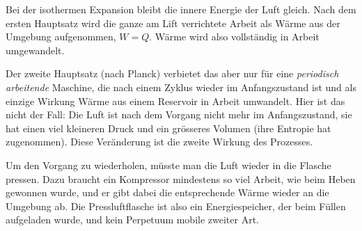 Bei der isothermen Expansion bleibt die innere Energie der Luft gleich. Nach dem ersten Hauptsatz wird die ganze am Lift verrichtete Arbeit als Wärme aus der Umgebung aufgenommen, $W = Q$. Wärme wird also vollständig in Arbeit umgewandelt.

Der zweite Hauptsatz (nach Planck) verbietet das aber nur für eine \emph{periodisch arbeitende} Maschine, die nach einem Zyklus wieder im Anfangszustand ist und als einzige Wirkung Wärme aus einem Reservoir in Arbeit umwandelt. Hier ist das nicht der Fall: Die Luft ist nach dem Vorgang nicht mehr im Anfangszustand, sie hat einen viel kleineren Druck und ein grösseres Volumen (ihre Entropie hat zugenommen). Diese Veränderung ist die zweite Wirkung des Prozesses.

Um den Vorgang zu wiederholen, müsste man die Luft wieder in die Flasche pressen. Dazu braucht ein Kompressor mindestens so viel Arbeit, wie beim Heben gewonnen wurde, und er gibt dabei die entsprechende Wärme wieder an die Umgebung ab. Die Pressluftflasche ist also ein Energiespeicher, der beim Füllen aufgeladen wurde, und kein Perpetuum mobile zweiter Art.
